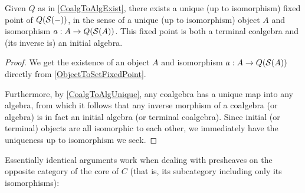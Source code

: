 \begin{theorem}
Given $Q$ as in \cref{CoalgToAlgExist}, there exists a unique (up to isomorphism) fixed point of $Q(\mathcal{S}(-))$, in the sense of a unique (up to isomorphism) object $A$ and isomorphism $a : A \to Q(\mathcal{S}(A))$. This fixed point is both a terminal coalgebra and (its inverse is) an initial algebra.
\end{theorem}
\begin{proof}
We get the existence of an object $A$ and isomorphism $a : A \to Q(\mathcal{S}(A))$ directly from \cref{ObjectToSetFixedPoint}.

Furthermore, by \cref{CoalgToAlgUnique}, any coalgebra has a unique map into any algebra, from which it follows that any inverse morphism of a coalgebra (or algebra) is in fact an initial algebra (or terminal coalgebra). Since initial (or terminal) objects are all isomorphic to each other, we immediately have the uniqueness up to isomorphism we seek.
\end{proof}

Essentially identical arguments work when dealing with presheaves on the opposite category of the core of $C$ (that is, its subcategory including only its isomorphisms):

